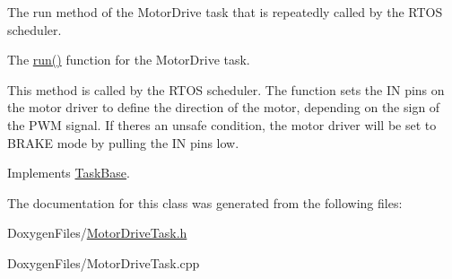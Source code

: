 The run method of the Motor\+Drive task that is repeatedly called by the R\+T\+OS scheduler. 

The {\ttfamily \mbox{\hyperlink{class_motor_drive_task_abc617fef420f9dc8cdd6144d8d7adea8}{run()}}} function for the Motor\+Drive task.

This method is called by the R\+T\+OS scheduler. The function sets the IN pins on the motor driver to define the direction of the motor, depending on the sign of the P\+WM signal. If there\textquotesingle{}s an unsafe condition, the motor driver will be set to B\+R\+A\+KE mode by pulling the IN pins low. 

Implements \mbox{\hyperlink{class_task_base_adcf6036ad9c860051ccf392ba5e7dbbc}{Task\+Base}}.



The documentation for this class was generated from the following files\+:\begin{DoxyCompactItemize}
\item 
Doxygen\+Files/\mbox{\hyperlink{_motor_drive_task_8h}{Motor\+Drive\+Task.\+h}}\item 
Doxygen\+Files/Motor\+Drive\+Task.\+cpp\end{DoxyCompactItemize}
